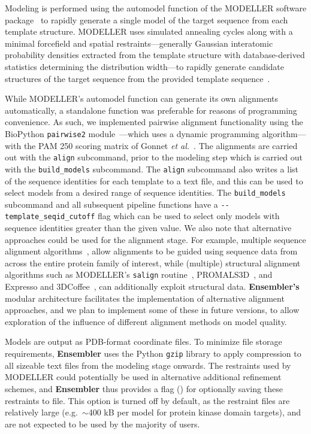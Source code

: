 \documentclass[aps,prl,preprint,nofootinbib,superscriptaddress,linenumbers]{revtex4-1}
\begin{document}
Modeling is performed using the automodel function of the MODELLER software package~\cite{fiser:prot-sci:2000:modeller,sali:jmb:1993:modeller} to rapidly generate a single model of the target sequence from each template structure.
MODELLER uses simulated annealing cycles along with a minimal forcefield and spatial restraints---generally Gaussian interatomic probability densities extracted from the template structure with database-derived statistics determining the distribution width---to rapidly generate candidate structures of the target sequence from the provided template sequence~\cite{fiser:prot-sci:2000:modeller,sali:jmb:1993:modeller}.

While MODELLER's automodel function can generate its own alignments automatically, a standalone function was preferable for reasons of programming convenience.
As such, we implemented pairwise alignment functionality using the BioPython {\tt pairwise2} module~\cite{cock:2009:biopython}---which uses a dynamic programming algorithm---with the PAM 250 scoring matrix of Gonnet \textit{et al.}~\cite{gonnet:science:1992:exhaustive-matching}.
The alignments are carried out with the {\tt align} subcommand, prior to the modeling step which is carried out with the {\tt build\_models} subcommand.
The {\tt align} subcommand also writes a list of the sequence identities for each template to a text file, and this can be used to select models from a desired range of sequence identities.
The {\tt build\_models} subcommand and all subsequent pipeline functions have a {\tt -{}-template\_seqid\_cutoff} flag which can be used to select only models with sequence identities greater than the given value.
We also note that alternative approaches could be used for the alignment stage.
For example, multiple sequence alignment algorithms~\cite{thompson:2011:msa-review}, allow alignments to be guided using sequence data from across the entire protein family of interest, while (multiple) structural alignment algorithms such as MODELLER's {\tt salign} routine~\cite{fiser:prot-sci:2000:modeller,sali:jmb:1993:modeller}, PROMALS3D~\cite{pei:2008:promals3d}, and Expresso and 3DCoffee~\cite{expresso,3dcoffee}, can additionally exploit structural data.
{\bf Ensembler's} modular architecture facilitates the implementation of alternative alignment approaches, and we plan to implement some of these in future versions, to allow exploration of the influence of different alignment methods on model quality.

Models are output as PDB-format coordinate files.
To minimize file storage requirements, {\bf Ensembler} uses the Python {\tt gzip} library to apply compression to all sizeable text files from the modeling stage onwards.
The restraints used by MODELLER could potentially be used in alternative additional refinement schemes, and {\bf Ensembler} thus provides a flag () for optionally saving these restraints to file.
This option is turned off by default, as the restraint files are relatively large (e.g.~$\sim$400 kB per model for protein kinase domain targets), and are not expected to be used by the majority of users.
\end{document}
